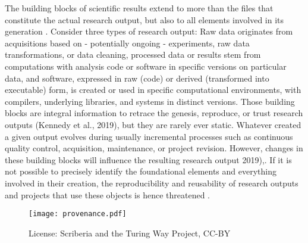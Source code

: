 



The building blocks of scientific results extend to more than the files that constitute the actual research output, but also to all elements involved in its generation \citep{claerbout1992electronic}.
Consider three types of research output: Raw data originates from acquisitions based on - potentially ongoing - experiments, raw data transformations, or data cleaning, processed data or results stem from computations with analysis code or software in specific versions on particular data, and software, expressed in raw (code) or derived (transformed into executable) form, is created or used in specific computational environments, with compilers, underlying libraries, and systems in distinct versions.
Those building blocks are integral information to retrace the genesis, reproduce, or trust research outputs (Kennedy et al., 2019), but they are rarely ever static.
Whatever created a given output evolves during usually incremental processes such as continuous quality control, acquisition, maintenance, or project revision.
However, changes in these building blocks will influence the resulting research output \citep{kennedy2019everything} 2019),\citep{glatard2015reproducibility}.
If it is not possible to precisely identify the foundational elements and everything involved in their creation, the reproducibility and reusability of research outputs and projects that use these objects is hence threatened \citep{kennedy2019everything}.

\begin{figure}
	\centering
	\texttt{[image: provenance.pdf]}
	\caption[Software provenance throughout the research process]{License: Scriberia and the Turing Way Project, CC-BY}
	\label{fig:prov1}
\end{figure}

